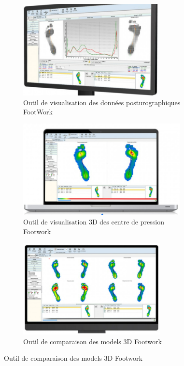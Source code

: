 \begin{figure}[H]
    \centering
    \begin{subfigure}[b]{0.45\textwidth}
      \centering
        \includegraphics[height=5cm]{images/analyse_marche/Footwork_pro.png}
        \caption{Outil de visualisation des données posturographiques FootWork}\label{fig:Footwork_pro}
    \end{subfigure}
    \begin{subfigure}[b]{0.5\textwidth}
        \centering
        \includegraphics[height=5cm]{images/analyse_marche/Footwork_pro_1.png}
        \caption{Outil de visualisation 3D des centre de pression Footwork}\label{fig:Footwork_pro1}
    \end{subfigure}
    \begin{subfigure}[b]{0.5\textwidth}
        \centering  
        \includegraphics[height=5cm]{images/analyse_marche/Footwork_pro_2.png}
        \caption{Outil de comparaison des models 3D Footwork}\label{fig:Footwork_pro2}
    \end{subfigure}
\end{figure}


